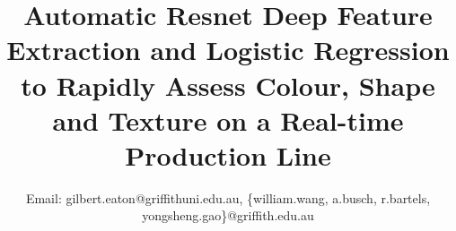 \documentclass[conference]{IEEEtran}
\begin{document}
%
\title{Automatic Resnet Deep Feature Extraction and Logistic Regression to Rapidly Assess Colour, Shape and Texture on a Real-time Production Line}




\author{
Email: gilbert.eaton@griffithuni.edu.au, \{william.wang, a.busch, r.bartels, yongsheng.gao\}@griffith.edu.au}


\maketitle

\end{document}
